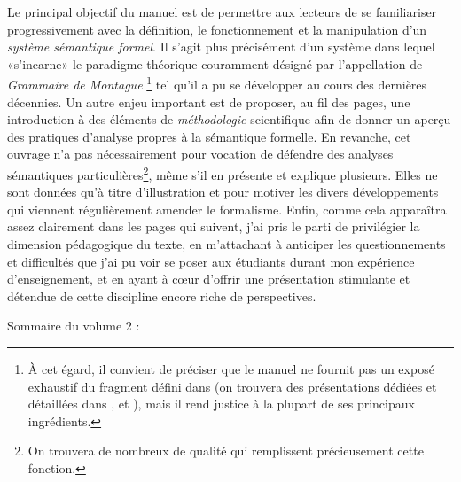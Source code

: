 \begin{refsection}
\fussy



Le principal objectif du manuel est de permettre aux lecteurs de se familiariser progressivement avec la définition, le fonctionnement et la manipulation d'un \emph{système sémantique formel}. Il s'agit plus précisément d'un système dans lequel «s'incarne» le paradigme théorique couramment désigné par l'appellation de \emph{Grammaire de Montague} \citep{Montague:EFL,Montague:UG,PTQ}%
\footnote{À cet égard, il convient de préciser que le manuel ne fournit pas un exposé exhaustif du fragment défini dans \citet{PTQ} (on trouvera des présentations dédiées et détaillées dans \citealt{DWP:81}, \citealt{Gamut:2} et \citealt{Galm:91}), mais il rend justice à la plupart de ses principaux ingrédients.} tel qu'il a pu se développer au cours des dernières décennies.   
Un autre enjeu important est de proposer, au fil des pages, une introduction à des éléments de \emph{méthodologie} scientifique afin de donner un aperçu des pratiques d'analyse propres à la sémantique formelle. 
En revanche, cet ouvrage n'a pas nécessairement pour vocation de défendre des analyses sémantiques particulières\footnote{On trouvera de nombreux  de qualité qui remplissent précieusement cette fonction.}, même s'il en présente et explique plusieurs. 
Elles ne sont données qu'à titre d'illustration et pour motiver les divers développements qui viennent régulièrement amender le formalisme.
Enfin, comme cela apparaîtra assez clairement dans les pages qui suivent, j'ai pris le parti de privilégier la dimension pédagogique du texte, en m'attachant à anticiper les questionnements et difficultés que j'ai pu voir se poser aux étudiants durant mon expérience d'enseignement, et en ayant à c\oe ur d'offrir une présentation stimulante et détendue de cette discipline encore riche de perspectives. 


\medskip

\noindent
Sommaire du volume 2 :


\end{refsection}
